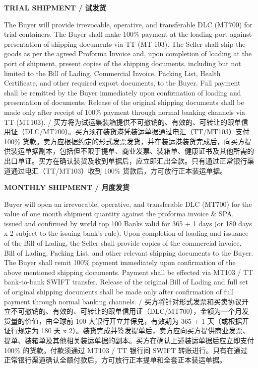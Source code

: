 \documentclass[a4paper,11pt]{article}
\begin{document}
\begin{center}{\large\textbf{\color{marooncolor}TRIAL SHIPMENT / 试发货}}\end{center}
\vspace{0.1cm}
\noindent The Buyer will provide irrevocable, operative, and transferable DLC (MT700) for trial containers. The Buyer shall make 100\% payment at the loading port against presentation of shipping documents via TT (MT 103). The Seller shall ship the goods as per the agreed Proforma Invoice and, upon completion of loading at the port of shipment, present copies of the shipping documents, including but not limited to the Bill of Lading, Commercial Invoice, Packing List, Health Certificate, and other required export documents, to the Buyer. Full payment shall be remitted by the Buyer immediately upon confirmation of loading and presentation of documents. Release of the original shipping documents shall be made only after receipt of 100\% payment through normal banking channels via TT (MT103). / 买方将为试运集装箱提供不可撤销的、有效的、可转让的跟单信用证（DLC/MT700）。买方须在装货港凭装运单据通过电汇（TT/MT103）支付 100\% 货款。卖方应根据约定的形式发票发货，并在装运港装货完成后，向买方提供装运单据副本，包括但不限于提单、商业发票、装箱单、健康证书及其他所需的出口单证。买方在确认装货及收到单据后，应立即汇出全款。只有通过正常银行渠道通过电汇（TT/MT103）收到 100\% 货款后，方可放行正本装运单据。

\vspace{0.3cm}
\begin{center}{\large\textbf{\color{marooncolor}MONTHLY SHIPMENT / 月度发货}}\end{center}
\vspace{0.1cm}
\noindent Buyer will open an irrevocable, operative, and transferable DLC (MT700) for the value of one month shipment quantity against the proforma invoice \& SPA, issued and confirmed by world top 100 Banks valid for 365 + 1 days (or 180 days x 2 subject to the issuing bank's rule). Upon completion of loading and issuance of the Bill of Lading, the Seller shall provide copies of the commercial invoice, Bill of Lading, Packing List, and other relevant shipping documents to the Buyer. The Buyer shall remit 100\% payment immediately upon confirmation of the above mentioned shipping documents. Payment shall be effected via MT103 / TT bank-to-bank SWIFT transfer. Release of the original Bill of Lading and full set of original shipping documents shall be made only after confirmation of full payment through normal banking channels. / 买方将针对形式发票和买卖协议开立不可撤销的、有效的、可转让的跟单信用证（DLC/MT700），金额为一个月发货量的价值，由全球前 100 大银行开立并保兑，有效期为 365 + 1 天（或根据开证行规定为 180 天 x 2）。装货完成并签发提单后，卖方应向买方提供商业发票、提单、装箱单及其他相关装运单据的副本。买方在确认上述装运单据后应立即支付 100\% 的货款。付款须通过 MT103 / TT 银行间 SWIFT 转账进行。只有在通过正常银行渠道确认全额付款后，方可放行正本提单和全套正本装运单据。
\end{document}
